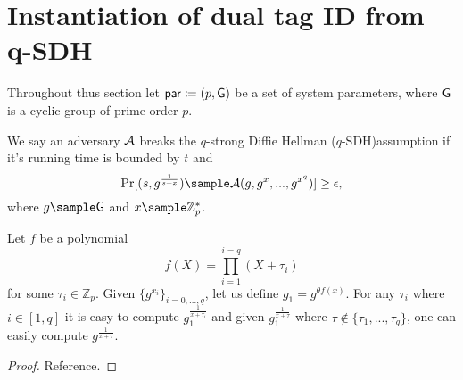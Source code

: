 \section{Instantiation of dual tag ID from q-SDH}
Throughout thus section let $\mathsf{par} \coloneqq (p,\mathsf{G}) $ be a set of system parameters, where 
$\mathsf{G} $ is a cyclic group of prime order $p$.

\begin{definition}
We say an adversary $\mathcal{A}$ breaks the $q$-strong Diffie Hellman ($q$-SDH)assumption if it's running time is bounded by $t$ and
$$\Pr[(s,g^{\frac{1}{s+x}}) \sample \adv(g,g^x,...,g^{x^q})] \geq \epsilon,$$
where 
$g \sample \G$ and $x \sample \mathbb{Z}_p^*$.
\end{definition}

\begin{lemma}
Let $f$ be a polynomial
$$f(X) = \prod_{i =1}^{i = q} (X+\tau_i)$$
for some $\tau_i \in \mathbb{Z}_p$. Given $\{g^{x_i}\}_{i=0,...,q}$, let us define $g_1 = g^{\theta f(x)}$. For any $\tau_i$ where $i \in [1,q]$ it is easy to compute $g_1^{\frac{1}{x+\tau_i}}$ and given $g_1^{\frac{1}{x + \tau}}$ where $\tau \notin \{\tau_1,...,\tau_q\}$, one can easily compute $g^{\frac{1}{x+\tau}}$.
\end{lemma}
\begin{proof}
Reference.
\end{proof}

